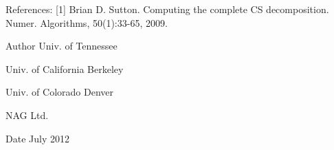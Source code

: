 \begin{DoxyParagraph}{References\+: }
\mbox{[}1\mbox{]} Brian D. Sutton. Computing the complete C\+S decomposition. Numer. Algorithms, 50(1)\+:33-\/65, 2009. 
\end{DoxyParagraph}
\begin{DoxyAuthor}{Author}
Univ. of Tennessee 

Univ. of California Berkeley 

Univ. of Colorado Denver 

N\+A\+G Ltd. 
\end{DoxyAuthor}
\begin{DoxyDate}{Date}
July 2012 
\end{DoxyDate}
